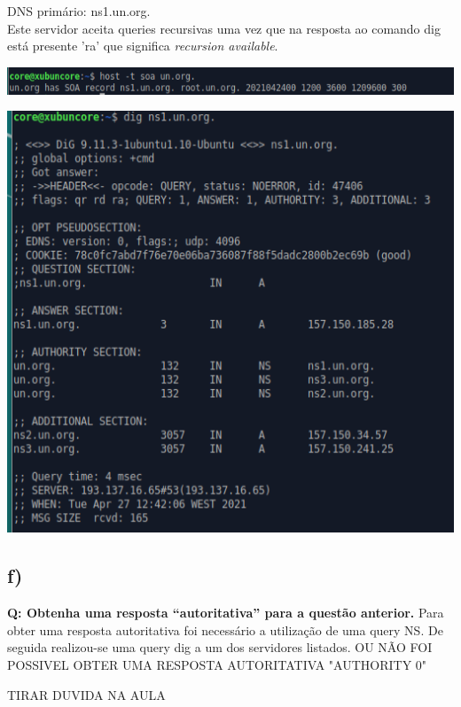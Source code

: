 \documentclass[a4paper]{article}
\begin{document}
DNS primário: ns1.un.org.\\
Este servidor aceita queries recursivas uma vez que na resposta ao comando dig está presente 'ra' que significa \textit{recursion available}.

\begin{center}
\includegraphics[scale=1]{images/1eHost}
\end{center}


\begin{center}
\includegraphics[scale=1]{images/1eDig}
\end{center}

\newpage

\subsection{ f)} \textbf{ Q: Obtenha uma resposta “autoritativa” para a questão anterior.}
\qquad Para obter uma resposta autoritativa foi necessário a utilização de uma query NS. De seguida realizou-se uma query dig a um dos servidores listados.  OU NÃO FOI POSSIVEL OBTER UMA RESPOSTA AUTORITATIVA "AUTHORITY 0"	\par
\qquad TIRAR DUVIDA NA AULA	
\end{document}
